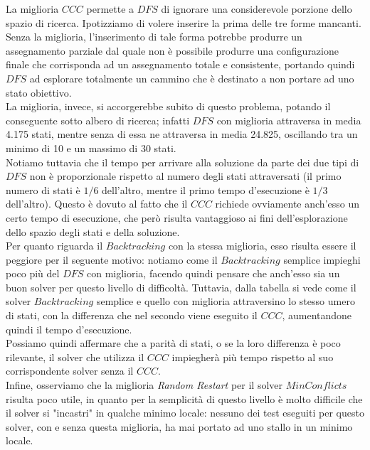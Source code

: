 La miglioria $CCC$ permette a $DFS$ di ignorare una considerevole porzione dello spazio di ricerca. Ipotizziamo di volere inserire la prima delle tre forme mancanti. Senza la miglioria, l'inserimento di tale forma potrebbe produrre un assegnamento parziale dal quale non è possibile produrre una configurazione finale che corrisponda ad un assegnamento totale e consistente, portando quindi $DFS$ ad esplorare totalmente un cammino che è destinato a non portare ad uno stato obiettivo.\\
La miglioria, invece, si accorgerebbe subito di questo problema, potando il conseguente sotto albero di ricerca; infatti $DFS$ con miglioria attraversa in media 4.175 stati, mentre senza di essa ne attraversa in media 24.825, oscillando tra un minimo di 10 e un massimo di 30 stati.\\
Notiamo tuttavia che il tempo per arrivare alla soluzione da parte dei due tipi di $DFS$ non è proporzionale rispetto al numero degli stati attraversati (il primo numero di stati è $1/6$ dell'altro, mentre il primo tempo d'esecuzione è $1/3$ dell'altro). Questo è dovuto al fatto che il $CCC$ richiede ovviamente anch'esso un certo tempo di esecuzione, che però risulta vantaggioso ai fini dell'esplorazione dello spazio degli stati e della soluzione.\\

Per quanto riguarda il $Backtracking$ con la stessa miglioria, esso risulta essere il peggiore per il seguente motivo: notiamo come il $Backtracking$ semplice impieghi poco più del $DFS$ con miglioria, facendo quindi pensare che anch'esso sia un buon solver per questo livello di difficoltà. Tuttavia, dalla tabella si vede come il solver $Backtracking$ semplice e quello con miglioria attraversino lo stesso umero di stati, con la differenza che nel secondo viene eseguito il $CCC$, aumentandone quindi il tempo d'esecuzione.\\
Possiamo quindi affermare che a parità di stati, o se la loro differenza è poco rilevante, il solver che utilizza il $CCC$ impiegherà più tempo rispetto al suo corrispondente solver senza il $CCC$.\\

Infine, osserviamo che la miglioria \textit{Random Restart} per il solver $MinConflicts$ risulta poco utile, in quanto per la semplicità di questo livello è molto difficile che il solver si "incastri" in qualche minimo locale: nessuno dei test eseguiti per questo solver, con e senza questa miglioria, ha mai portato ad uno stallo in un minimo locale.
